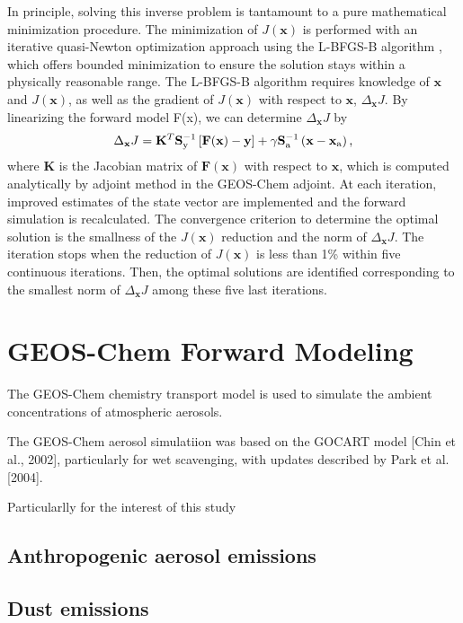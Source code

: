  In principle, solving this inverse problem is tantamount to a pure
 mathematical minimization procedure. The minimization of $J(\mathbf{x})$
 is performed with an iterative quasi-Newton optimization approach
 using the L-BFGS-B algorithm \citep{byrd95,zhu94},
 which offers bounded minimization to ensure the solution stays
 within a physically reasonable range. The L-BFGS-B algorithm
 requires knowledge of $\mathbf{x}$ and $J(\mathbf{x})$,
 as well as the gradient of $J(\mathbf{x})$ with respect to
 $\mathbf{x}$, $\Delta_\mathbf{x}J$. By linearizing the forward model F(x),
 we can determine $\Delta_\mathbf{x}J$ by
 \begin{equation} \label{eq:dcost}
  \Delta_\mathbf{x}J = \mathbf{K}^T \mathbf{S}_\text{y}^{-1} \left[ \mathbf{F(x)-y}\right]
                     + \gamma \mathbf{S}_\text{a}^{-1} \left( \mathbf{x}-\mathbf{x}_\text{a} \right) \mbox{,} 
 \end{equation}
 where $\mathbf{K}$ is the Jacobian matrix of $\mathbf{F(x)}$
 with respect to $\mathbf{x}$, which is computed analytically by adjoint method
 in the GEOS-Chem adjoint. At each iteration, improved estimates
 of the state vector are implemented and the forward simulation is recalculated.
 The convergence criterion to determine the optimal solution is the smallness
 of the $J(\mathbf{x})$ reduction and the norm of $\Delta_\mathbf{x}J$.
 The iteration stops when the reduction of $J(\mathbf{x})$ is less than 1\% within
 five continuous iterations. Then, the optimal solutions are identified
 corresponding to the smallest norm of $\Delta_\mathbf{x}J$ among
 these five last iterations.

\section{GEOS-Chem Forward Modeling} \label{sec:gc}

 The GEOS-Chem chemistry transport model is used to simulate the ambient concentrations 
 of atmospheric aerosols.

 The GEOS-Chem aerosol simulatiion was based on the GOCART model [Chin et al., 2002], 
 particularly for wet scavenging, with updates described by Park et al. [2004]. 

 Particularlly for the interest of this study
 \subsection{Anthropogenic aerosol emissions} 
 
 \subsection{Dust emissions}

